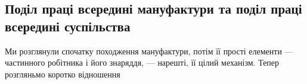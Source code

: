 \vspace{-\medskipamount}
\subsection{Поділ праці всередині мануфактури та поділ праці
всередині суспільства}

Ми розглянули спочатку походження мануфактури, потім
її прості елементи — частинного робітника і його знаряддя, —
нарешті, її цілий механізм. Тепер розгляньмо коротко відношення
\parbreak{}  %
